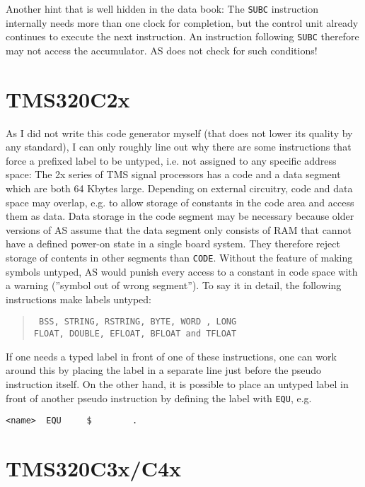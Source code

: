 \documentclass[12pt,twoside]{report}
\newcommand{\tty}[1]{{\tt #1}}
\begin{document}
Another hint that is well hidden in the data book: The \tty{SUBC}
instruction internally needs more than one clock for completion, but
the control unit already continues to execute the next instruction.
An instruction following \tty{SUBC} therefore may not access the
accumulator.  AS does not check for such conditions!


\section{TMS320C2x}

As I did not write this code generator myself (that does not lower
its quality by any standard), I can only roughly line out why there
are some instructions that force a prefixed label to be untyped, i.e.
not assigned to any specific address space: The 2x series of TMS
signal processors has a code and a data segment which are both 64
Kbytes large.  Depending on external circuitry, code and data space may
overlap, e.g. to allow storage of constants in the code area and
access them as data.  Data storage in the code segment may be
necessary because older versions of AS assume that the data segment
only consists of RAM that cannot have a defined power-on state in a
single board system.  They therefore reject storage of contents in
other segments than \tty{CODE}.  Without the feature of making symbols
untyped, AS would punish every access to a constant in code space
with a warning (''symbol out of wrong segment'').  To say it in detail,
the following instructions make labels untyped:
\begin{quote}\tt
  BSS, STRING, RSTRING, BYTE, WORD , LONG\\
  FLOAT, DOUBLE, EFLOAT, BFLOAT and TFLOAT
\rm\end{quote}
If one needs a typed label in front of one of these instructions, one
can work around this by placing the label in a separate line just
before the pseudo instruction itself.  On the other hand, it is
possible to place an untyped label in front of another pseudo
instruction by defining the label with \tty{EQU}, e.g.
\begin{verbatim}
<name>  EQU     $        .
\end{verbatim}


\section{TMS320C3x/C4x}
\end{document}
